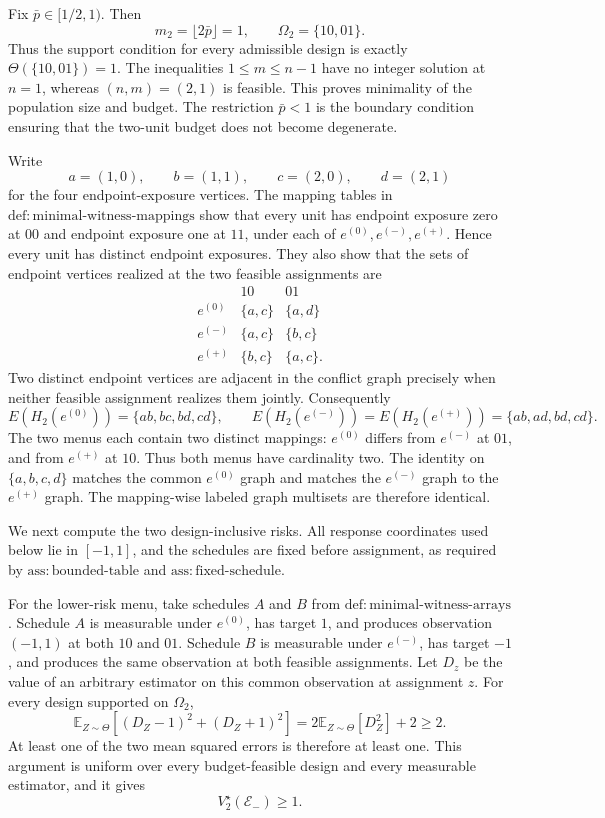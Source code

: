 Fix \(\bar p\in[1/2,1)\).  Then
\[
 m_2=\lfloor2\bar p\rfloor=1,
 \qquad
 \Omega_2=\{10,01\}.
\]
Thus the support condition for every admissible design is exactly
\(\Theta(\{10,01\})=1\).  The inequalities \(1\le m\le n-1\) have no
integer solution at \(n=1\), whereas \((n,m)=(2,1)\) is feasible.  This
proves minimality of the population size and budget.  The restriction
\(\bar p<1\) is the boundary condition ensuring that the two-unit budget
does not become degenerate.

Write
\[
 a=(1,0),\qquad b=(1,1),\qquad c=(2,0),\qquad d=(2,1)
\]
for the four endpoint-exposure vertices.  The mapping tables in
\(\mathrm{def{:}minimal\text{-}witness\text{-}mappings}\) show that every
unit has endpoint exposure zero at \(00\) and endpoint exposure one at
\(11\), under each of \(e^{(0)},e^{(-)},e^{(+)}\).  Hence every unit has
distinct endpoint exposures.  They also show that the sets of endpoint
vertices realized at the two feasible assignments are
\[
\begin{array}{c|cc}
 &10&01\\ \hline
 e^{(0)}&\{a,c\}&\{a,d\}\\
 e^{(-)}&\{a,c\}&\{b,c\}\\
 e^{(+)}&\{b,c\}&\{a,c\}.
\end{array}
\]
Two distinct endpoint vertices are adjacent in the conflict graph precisely
when neither feasible assignment realizes them jointly.  Consequently
\[
 E(H_2(e^{(0)}))=\{ab,bc,bd,cd\},
 \qquad
 E(H_2(e^{(-)}))=E(H_2(e^{(+)}))=\{ab,ad,bd,cd\}.
\]
The two menus each contain two distinct mappings: \(e^{(0)}\) differs from
\(e^{(-)}\) at \(01\), and from \(e^{(+)}\) at \(10\).  Thus both menus
have cardinality two.  The identity on \(\{a,b,c,d\}\) matches the common
\(e^{(0)}\) graph and matches the \(e^{(-)}\) graph to the
\(e^{(+)}\) graph.  The mapping-wise labeled graph multisets are therefore
identical.

We next compute the two design-inclusive risks.  All response coordinates
used below lie in \([-1,1]\), and the schedules are fixed before assignment,
as required by \(\mathrm{ass{:}bounded\text{-}table}\) and
\(\mathrm{ass{:}fixed\text{-}schedule}\).

For the lower-risk menu, take schedules \(A\) and \(B\) from
\(\mathrm{def{:}minimal\text{-}witness\text{-}arrays}\).  Schedule \(A\)
is measurable under \(e^{(0)}\), has target \(1\), and produces observation
\((-1,1)\) at both \(10\) and \(01\).  Schedule \(B\) is measurable under
\(e^{(-)}\), has target \(-1\), and produces the same observation at both
feasible assignments.  Let \(D_z\) be the value of an arbitrary estimator
on this common observation at assignment \(z\).  For every design supported
on \(\Omega_2\),
\[
 \mathbb E_{Z\sim\Theta}\!\left[(D_Z-1)^2+(D_Z+1)^2\right]
 =2\mathbb E_{Z\sim\Theta}[D_Z^2]+2
 \ge 2.
\]
At least one of the two mean squared errors is therefore at least one.  This
argument is uniform over every budget-feasible design and every measurable
estimator, and it gives
\[
 V_2^\star(\mathcal E_-)\ge1.
\]

